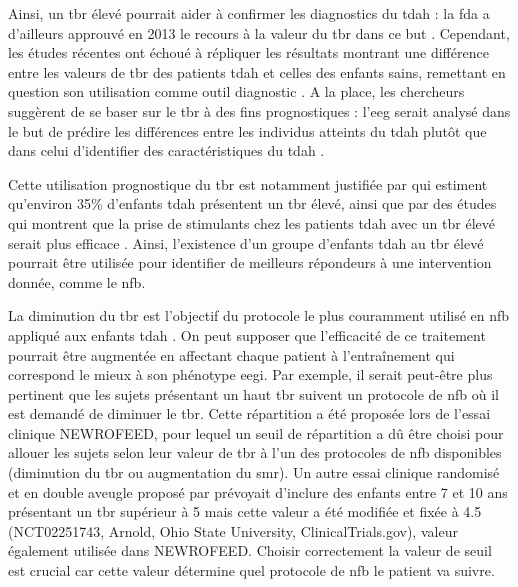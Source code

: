 Ainsi, un \gls{tbr} élevé pourrait aider à confirmer les diagnostics du \gls{tdah} : la \gls{fda} a d'ailleurs approuvé en 2013 le recours à la valeur du 
\gls{tbr} dans ce but \citep{NebaHealth, FDA, Saad2018, Barry2009}. Cependant, les études récentes ont échoué à répliquer les résultats
montrant une différence entre les valeurs de \gls{tbr} des patients \gls{tdah} et celles des enfants sains, remettant en question son utilisation comme outil 
diagnostic \citep{Zhang2017, Arns2013, Clarke2001, VanDoren2017, Lenartowicz2014}. A la place, les chercheurs suggèrent de se baser sur le \gls{tbr} à des fins prognostiques : l'\gls{eeg} 
serait analysé dans le but de prédire les différences entre les individus atteints du \gls{tdah} plutôt que dans celui d'identifier 
des caractéristiques du \gls{tdah} \citep{Arns2013, Zhang2017}. 

Cette utilisation prognostique du \gls{tbr} est notamment justifiée par \citet{Clarke2011} qui estiment qu'environ 35\% d'enfants \gls{tdah} présentent un \gls{tbr} élevé, ainsi que 
par des études qui montrent que la prise de stimulants chez les patients \gls{tdah} avec un \gls{tbr} élevé serait plus efficace \citep{Arns2012med, Clarke2002}. 
Ainsi, l'existence d'un groupe d'enfants \gls{tdah} au \gls{tbr} élevé pourrait être utilisée pour identifier de meilleurs répondeurs à une intervention donnée, comme le \gls{nfb}. 

La diminution du \gls{tbr} est l'objectif du protocole le plus couramment utilisé en \gls{nfb} appliqué aux enfants \gls{tdah} \citep{Arns2014}. 
On peut supposer que l'efficacité de ce traitement pourrait être augmentée en affectant chaque patient à l'entraînement qui correspond le mieux à son phénotype \gls{eegi}. 
Par exemple, il serait peut-être plus pertinent que les sujets présentant un haut \gls{tbr} suivent un protocole de \gls{nfb} où il est demandé de 
diminuer le \gls{tbr}. Cette répartition a été proposée lors de l'essai clinique NEWROFEED, pour lequel un seuil de répartition a dû être choisi pour allouer les sujets 
selon leur valeur de \gls{tbr} à l'un des protocoles de \gls{nfb} disponibles (diminution du \gls{tbr} ou augmentation du \gls{smr}). 
Un autre essai clinique randomisé et en double aveugle proposé par \citet{Kerson2013} prévoyait d'inclure des enfants entre 7 et 10 ans présentant un \gls{tbr} supérieur à 5 mais cette valeur a 
été modifiée et fixée à 4.5 (NCT02251743, Arnold, Ohio State University, ClinicalTrials.gov), valeur également
utilisée dans NEWROFEED. Choisir correctement la valeur de seuil est crucial car cette valeur détermine quel protocole de \gls{nfb} le patient va suivre. 

